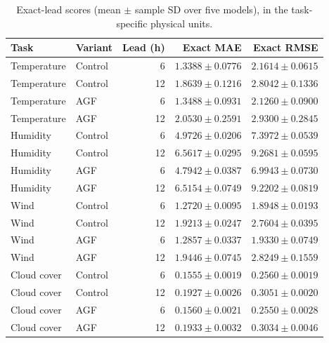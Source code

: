 \documentclass[10pt,a4paper]{article}
\begin{document}
\begin{table}[H]\centering\small\setlength{\tabcolsep}{5pt}\setlength{\parskip}{0pt}

\caption{Exact-lead scores (mean $\pm$ sample SD over five models), in the task-specific physical units.}\label{tab:horizons}

\begin{tabular}{llrrr}

\toprule
Task & Variant & Lead (h) & Exact MAE & Exact RMSE \\
\midrule

Temperature & Control & 6 & $1.3388 \pm 0.0776$ & $2.1614 \pm 0.0615$ \\

Temperature & Control & 12 & $1.8639 \pm 0.1216$ & $2.8042 \pm 0.1336$ \\

Temperature & AGF & 6 & $1.3488 \pm 0.0931$ & $2.1260 \pm 0.0900$ \\

Temperature & AGF & 12 & $2.0530 \pm 0.2591$ & $2.9300 \pm 0.2845$ \\

Humidity & Control & 6 & $4.9726 \pm 0.0206$ & $7.3972 \pm 0.0539$ \\

Humidity & Control & 12 & $6.5617 \pm 0.0295$ & $9.2681 \pm 0.0595$ \\

Humidity & AGF & 6 & $4.7942 \pm 0.0387$ & $6.9943 \pm 0.0730$ \\

Humidity & AGF & 12 & $6.5154 \pm 0.0749$ & $9.2202 \pm 0.0819$ \\

Wind & Control & 6 & $1.2720 \pm 0.0095$ & $1.8948 \pm 0.0193$ \\

Wind & Control & 12 & $1.9213 \pm 0.0247$ & $2.7604 \pm 0.0395$ \\

Wind & AGF & 6 & $1.2857 \pm 0.0337$ & $1.9330 \pm 0.0749$ \\

Wind & AGF & 12 & $1.9446 \pm 0.0745$ & $2.8249 \pm 0.1559$ \\

Cloud cover & Control & 6 & $0.1555 \pm 0.0019$ & $0.2560 \pm 0.0019$ \\

Cloud cover & Control & 12 & $0.1927 \pm 0.0026$ & $0.3051 \pm 0.0020$ \\

Cloud cover & AGF & 6 & $0.1560 \pm 0.0021$ & $0.2550 \pm 0.0028$ \\

Cloud cover & AGF & 12 & $0.1933 \pm 0.0032$ & $0.3034 \pm 0.0046$ \\

\bottomrule\end{tabular}\end{table}
\end{document}
